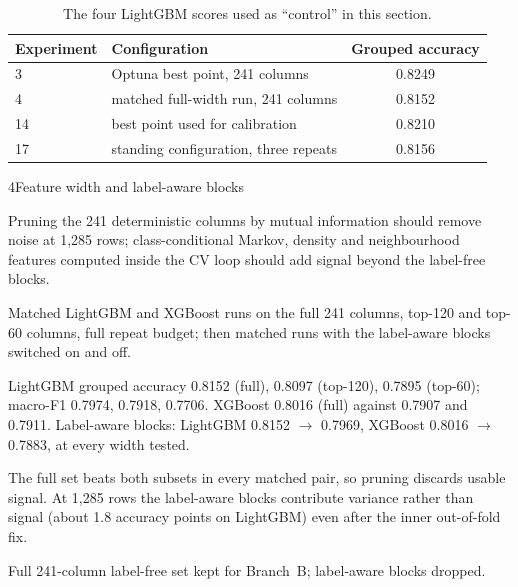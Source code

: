  \begin{table}[t]
\caption{The four LightGBM scores used as ``control'' in this section.}
\label{tab:t3-control}
\centering
\begin{tabular}{llc}
\hline
Experiment & Configuration & Grouped accuracy \\
\hline
3 & Optuna best point, 241 columns & 0.8249 \\
4 & matched full-width run, 241 columns & 0.8152 \\
14 & best point used for calibration & 0.8210 \\
17 & standing configuration, three repeats & 0.8156 \\
\hline
\end{tabular}
\end{table}
\begin{explog}{4}{Feature width and label-aware blocks}
\item[Hypothesis] Pruning the 241 deterministic columns by mutual information should remove
noise at 1{,}285 rows; class-conditional Markov, density and neighbourhood
features computed inside the CV loop should add signal beyond the label-free
blocks.
\item[Method] Matched LightGBM and XGBoost runs on the full 241 columns, top-120 and
top-60 columns, full repeat budget; then matched runs with the label-aware blocks
switched on and off. %
\item[Result] LightGBM grouped accuracy 0.8152 (full), 0.8097 (top-120), 0.7895 (top-60);
macro-F1 0.7974, 0.7918, 0.7706. XGBoost 0.8016 (full) against 0.7907 and 0.7911.
Label-aware blocks: LightGBM 0.8152 $\rightarrow$ 0.7969, XGBoost 0.8016
$\rightarrow$ 0.7883, at every width tested.
\item[Inference] The full set beats both subsets in every matched pair, so pruning discards
usable signal. At 1{,}285 rows the label-aware blocks contribute variance rather
than signal (about 1.8 accuracy points on LightGBM) even after the inner
out-of-fold fix.
\item[Verdict] Full 241-column label-free set kept for Branch~B; label-aware blocks
dropped.
\end{explog}

